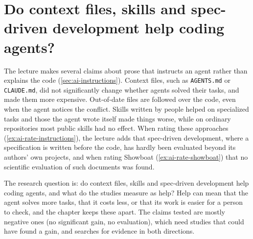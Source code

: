 % 


\chapter{Do context files, skills and spec-driven development help coding
  agents?}
\label{app:ai-rq4}

The lecture makes several claims about prose that instructs an agent rather
than explains the code (\cref{sec:ai-instructions}).
Context files, such as \texttt{AGENTS.md} or \texttt{CLAUDE.md}, did not
significantly change whether agents solved their tasks, and made them more
expensive.
Out-of-date files are followed over the code, even when the agent notices the
conflict.
Skills written by people helped on specialized tasks and those the agent wrote
itself made things worse, while on ordinary repositories most public skills had
no effect.
When rating these approaches (\cref{ex:ai-rate-instructions}), the lecture adds
that spec-driven development, where a specification is written before the code,
has hardly been evaluated beyond its authors' own projects, and when rating
Showboat (\cref{ex:ai-rate-showboat}) that no scientific evaluation of such
documents was found.

The research question is: do context files, skills and spec-driven development
help coding agents, and what do the studies measure as help?
Help can mean that the agent solves more tasks, that it costs less, or that its
work is easier for a person to check, and the chapter keeps these apart.
The claims tested are mostly negative ones (no significant gain, no
evaluation), which need studies that could have found a gain, and searches for
evidence in both directions.


